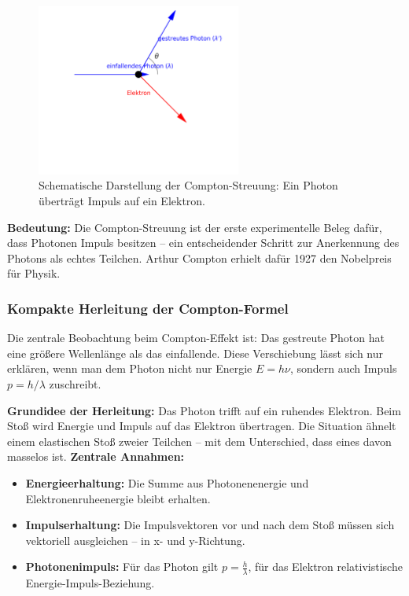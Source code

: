\vspace{1em}
\begin{figure}[H]
	\begin{center}
		
		
		\includegraphics[width=0.6\textwidth]{bilder/compton-schema.png}
	\end{center}
	\caption{Schematische Darstellung der Compton-Streuung: Ein Photon überträgt Impuls auf ein Elektron.}
\end{figure}

\textbf{Bedeutung:}  
Die Compton-Streuung ist der erste experimentelle Beleg dafür, dass Photonen Impuls besitzen – ein entscheidender Schritt zur Anerkennung des Photons als echtes Teilchen. Arthur Compton erhielt dafür 1927 den Nobelpreis für Physik.

\subsubsection{Kompakte Herleitung der Compton-Formel}

Die zentrale Beobachtung beim Compton-Effekt ist: Das gestreute Photon hat eine größere Wellenlänge als das einfallende. Diese Verschiebung lässt sich nur erklären, wenn man dem Photon nicht nur Energie \( E = h\nu \), sondern auch Impuls \( p = h/\lambda \) zuschreibt.

\textbf{Grundidee der Herleitung:}
Das Photon trifft auf ein ruhendes Elektron. Beim Stoß wird Energie und Impuls auf das Elektron übertragen. Die Situation ähnelt einem elastischen Stoß zweier Teilchen – mit dem Unterschied, dass eines davon masselos ist.
\newpage
\noindent
\textbf{Zentrale Annahmen:}
\begin{itemize}
	\item \textbf{Energieerhaltung:} Die Summe aus Photonenenergie und Elektronenruheenergie bleibt erhalten.
	\item \textbf{Impulserhaltung:} Die Impulsvektoren vor und nach dem Stoß müssen sich vektoriell ausgleichen – in x- und y-Richtung.
	\item \textbf{Photonenimpuls:} Für das Photon gilt \( p = \frac{h}{\lambda} \), für das Elektron relativistische Energie-Impuls-Beziehung.
\end{itemize}

